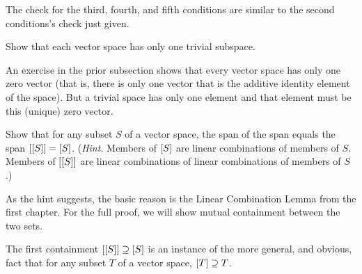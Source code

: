 \begin{exercises}
\begin{answer}
      The check for the third, fourth, and fifth conditions are similar to the
      second conditions's check just given.  
    \end{answer}
  \item 
    Show that each vector space has only one trivial subspace.
    \begin{answer}
      An exercise in the prior subsection shows that every vector space
      has only one zero vector (that is, there is only one vector that is the
      additive identity element of the space).
      But a trivial space has only one element and that element must be this
      (unique) zero vector.
    \end{answer}
  \recommended \item 
    Show that for any subset \( S \) of a vector space,
    the span of the span equals the span 
    \( \relax [ \relax [S\relax ] \relax ]=\relax [S\relax ] \).
    (\textit{Hint.} 
    Members of $\relax [S\relax ]$ are linear combinations of members of $S$.
    Members of $\relax [\relax [S\relax ]\relax ]$ are linear combinations of 
    linear combinations of members of $S$.)
    \begin{answer}
      As the hint suggests, the basic reason is the Linear Combination Lemma
      from the first chapter.
      For the full proof, we will show mutual containment between the two sets.

      The first containment \( \relax [ \relax [S\relax ] \relax ]\supseteq\relax [S\relax ]  \)
      is an instance of the more general, and obvious, fact that for any 
      subset \( T \) of a vector space, \( \relax [T\relax ]\supseteq T \).


\end{answer}
\end{exercises}
